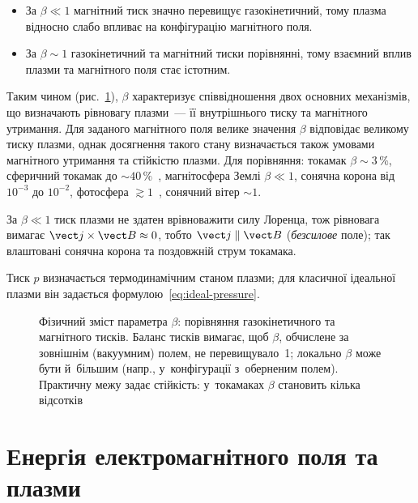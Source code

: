 \begin{itemize}

    \item За $\beta\ll1$ магнітний тиск значно перевищує газокінетичний, тому плазма
      відносно слабо впливає на конфігурацію магнітного поля.

    \item За $\beta\sim1$ газокінетичний та магнітний тиски порівнянні, тому взаємний
      вплив плазми та магнітного поля стає істотним.

\end{itemize}

Таким чином (рис.~\ref{pic:plasma-beta}), $\beta$ характеризує співвідношення двох основних механізмів, що визначають
рівновагу плазми~--- її внутрішнього тиску та магнітного утримання. Для заданого
магнітного поля велике значення $\beta$ відповідає великому тиску плазми, однак досягнення
такого стану визначається також умовами магнітного утримання та стійкістю плазми. Для порівняння: токамак $\beta\sim3\,\%$, сферичний токамак до $\sim40\,\%$~\cite{chen2016introduction}, магнітосфера Землі $\beta\ll1$,
сонячна корона від $10^{-3}$ до $10^{-2}$, фотосфера $\gtrsim1$~\cite{gary2001plasma}, сонячний вітер $\sim1$.

За $\beta\ll1$ тиск плазми не здатен врівноважити силу Лоренца, тож рівновага вимагає
$\vect j\times\vect B\approx0$, тобто $\vect j\parallel\vect B$ (\emph{безсилове} поле); так влаштовані
сонячна корона та поздовжній струм токамака.

Тиск $p$ визначається термодинамічним станом плазми; для класичної ідеальної плазми він
задається формулою~\eqref{eq:ideal-pressure}.

\begin{figure}[ht]
    \centering
    \caption{Фізичний зміст параметра $\beta$: порівняння газокінетичного та магнітного
    тисків. Баланс тисків вимагає, щоб $\beta$, обчислене за зовнішнім (вакуумним) полем, не
    перевищувало~1; локально $\beta$ може бути й~більшим (напр., у~конфігурації з~оберненим
    полем). Практичну межу задає стійкість: у~токамаках $\beta$ становить кілька відсотків}
    \label{pic:plasma-beta}
\end{figure}




\section{Енергія електромагнітного поля та плазми}



